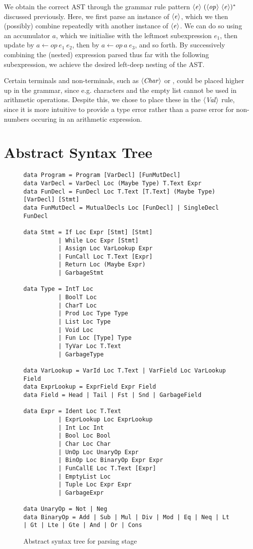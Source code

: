 We obtain the correct AST through the grammar rule pattern
$\langle \textit{e}\kern.7pt \rangle\ (\langle \textit{op}\kern.7pt \rangle\ \langle \textit{e}\kern.7pt \rangle)^*$ discussed previously.
Here, we first parse an instance of $\langle \textit{e}\kern.7pt \rangle$, which we then (possibly) combine
repeatedly with another instance of $\langle \textit{e}\kern.7pt \rangle$. We can do so using an
accumulator $a$, which we initialise with the leftmost subexpression
$e_1$, then update by $a \leftarrow op\ e_1\ e_2$, then by
$a \leftarrow op\ a\ e_3$, and so forth. By successively combining the (nested)
expression parsed thus far with the following subexpression, we achieve the
desired left-deep nesting of the AST.

Certain terminals and non-terminals, such as $\langle \textit{Char}\kern.7pt \rangle$ or \code{[]}, could be
placed higher up in the grammar, since e.g. characters and the empty list cannot
be used in arithmetic operations. Despite this, we chose to place these in the
$\langle \textit{Val}\kern.7pt \rangle$ rule, since it is more intuitive to provide a type error rather than
a parse error for non-numbers occuring in an arithmetic expression.


\section{Abstract Syntax Tree}

\begin{figure}
\begin{verbatim}
data Program = Program [VarDecl] [FunMutDecl]
data VarDecl = VarDecl Loc (Maybe Type) T.Text Expr
data FunDecl = FunDecl Loc T.Text [T.Text] (Maybe Type) [VarDecl] [Stmt]
data FunMutDecl = MutualDecls Loc [FunDecl] | SingleDecl FunDecl

data Stmt = If Loc Expr [Stmt] [Stmt]
          | While Loc Expr [Stmt]
          | Assign Loc VarLookup Expr
          | FunCall Loc T.Text [Expr]
          | Return Loc (Maybe Expr)
          | GarbageStmt

data Type = IntT Loc
          | BoolT Loc
          | CharT Loc
          | Prod Loc Type Type
          | List Loc Type
          | Void Loc
          | Fun Loc [Type] Type
          | TyVar Loc T.Text
          | GarbageType

data VarLookup = VarId Loc T.Text | VarField Loc VarLookup Field
data ExprLookup = ExprField Expr Field
data Field = Head | Tail | Fst | Snd | GarbageField

data Expr = Ident Loc T.Text
          | ExprLookup Loc ExprLookup
          | Int Loc Int
          | Bool Loc Bool
          | Char Loc Char
          | UnOp Loc UnaryOp Expr
          | BinOp Loc BinaryOp Expr Expr
          | FunCallE Loc T.Text [Expr]
          | EmptyList Loc
          | Tuple Loc Expr Expr
          | GarbageExpr

data UnaryOp = Not | Neg
data BinaryOp = Add | Sub | Mul | Div | Mod | Eq | Neq | Lt | Gt | Lte | Gte | And | Or | Cons
\end{verbatim}
	\caption{Abstract syntax tree for parsing stage}
  \label{fig:parse-ast}
\end{figure}


